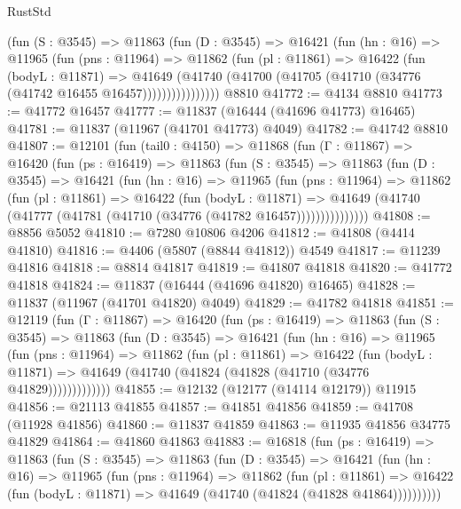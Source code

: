 \begin{lexlean}{RustStd}
\begin{coremodule}
            (fun (S : @3545) =>
            @11863
              (fun (D : @3545) =>
              @16421
                (fun (hn : @16) =>
                @11965
                  (fun (pns : @11964) =>
                  @11862
                    (fun (pl : @11861) =>
                    @16422
                      (fun (bodyL : @11871) =>
                      @41649
                        (@41740
                          (@41700 (@41705 (@41710 (@34776 (@41742 @16455 @16457))))))))))))))))
    @8810
@41772 := @4134 @8810
@41773 := @41772 @16457
@41777 := @11837 (@16444 (@41696 @41773) @16465)
@41781 := @11837 (@11967 (@41701 @41773) @4049)
@41782 := @41742 @8810
@41807 := @12101
    (fun (tail0 : @4150) =>
    @11868
      (fun (Γ : @11867) =>
      @16420
        (fun (ps : @16419) =>
        @11863
          (fun (S : @3545) =>
          @11863
            (fun (D : @3545) =>
            @16421
              (fun (hn : @16) =>
              @11965
                (fun (pns : @11964) =>
                @11862
                  (fun (pl : @11861) =>
                  @16422
                    (fun (bodyL : @11871) =>
                    @41649 (@41740 (@41777 (@41781 (@41710 (@34776 (@41782 @16457)))))))))))))))
@41808 := @8856 @5052
@41810 := @7280 @10806 @4206
@41812 := @41808 (@4414 @41810)
@41816 := @4406 (@5807 (@8844 @41812)) @4549
@41817 := @11239 @41816
@41818 := @8814 @41817
@41819 := @41807 @41818
@41820 := @41772 @41818
@41824 := @11837 (@16444 (@41696 @41820) @16465)
@41828 := @11837 (@11967 (@41701 @41820) @4049)
@41829 := @41782 @41818
@41851 := @12119
    (fun (Γ : @11867) =>
    @16420
      (fun (ps : @16419) =>
      @11863
        (fun (S : @3545) =>
        @11863
          (fun (D : @3545) =>
          @16421
            (fun (hn : @16) =>
            @11965
              (fun (pns : @11964) =>
              @11862
                (fun (pl : @11861) =>
                @16422
                  (fun (bodyL : @11871) =>
                  @41649 (@41740 (@41824 (@41828 (@41710 (@34776 @41829)))))))))))))
@41855 := @12132 (@12177 (@14114 @12179)) @11915
@41856 := @21113 @41855
@41857 := @41851 @41856
@41859 := @41708 (@11928 @41856)
@41860 := @11837 @41859
@41863 := @11935 @41856 @34775 @41829
@41864 := @41860 @41863
@41883 := @16818
    (fun (ps : @16419) =>
    @11863
      (fun (S : @3545) =>
      @11863
        (fun (D : @3545) =>
        @16421
          (fun (hn : @16) =>
          @11965
            (fun (pns : @11964) =>
            @11862
              (fun (pl : @11861) =>
              @16422 (fun (bodyL : @11871) => @41649 (@41740 (@41824 (@41828 @41864))))))))))

\end{coremodule}
\end{lexlean}
